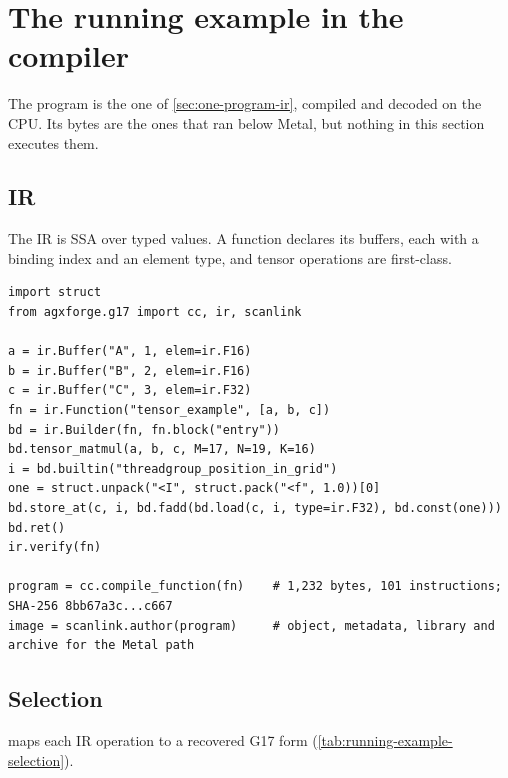 \section{The running example in the compiler}\label{ch:running-example-through}

The program is the one of \cref{sec:one-program-ir}, compiled and decoded on the CPU. Its bytes are the ones that ran
below Metal, but nothing in this section executes them.

\subsection*{IR}

The IR is SSA over typed values. A function declares its buffers, each with a binding index and an
element type, and tensor operations are first-class.

\begin{lstlisting}[style=py]
import struct
from agxforge.g17 import cc, ir, scanlink

a = ir.Buffer("A", 1, elem=ir.F16)
b = ir.Buffer("B", 2, elem=ir.F16)
c = ir.Buffer("C", 3, elem=ir.F32)
fn = ir.Function("tensor_example", [a, b, c])
bd = ir.Builder(fn, fn.block("entry"))
bd.tensor_matmul(a, b, c, M=17, N=19, K=16)
i = bd.builtin("threadgroup_position_in_grid")
one = struct.unpack("<I", struct.pack("<f", 1.0))[0]
bd.store_at(c, i, bd.fadd(bd.load(c, i, type=ir.F32), bd.const(one)))
bd.ret()
ir.verify(fn)

program = cc.compile_function(fn)    # 1,232 bytes, 101 instructions; SHA-256 8bb67a3c...c667
image = scanlink.author(program)     # object, metadata, library and archive for the Metal path
\end{lstlisting}

\subsection*{Selection}

 maps each IR operation to a recovered G17 form (\cref{tab:running-example-selection}).

